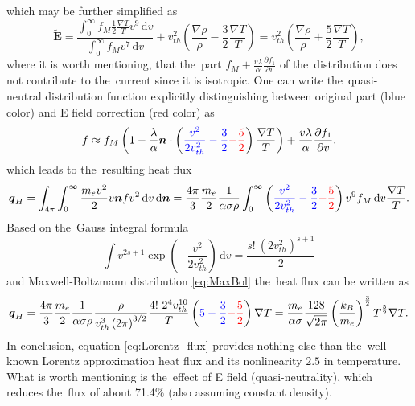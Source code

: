 \documentclass[review]{elsarticle}
\newcommand{\pdv}[2]{\frac{\partial{#1}}{\partial{#2}}}
\newcommand{\vect}[1]{\boldsymbol{#1}}
\newcommand{\dI}{\text{d}}
\newcommand{\mfp}{\lambda}
\newcommand{\vmag}{v}
\newcommand{\vth}{v_{th}}
\newcommand{\vn}{\vect{n}}
\newcommand{\tE}{\vect{\tilde{E}}}
\newcommand{\me}{m_e}
\newcommand{\kB}{k_B}
\newcommand{\crs}{\sigma}
\newcommand{\fM}{f_M}
\begin{document}
which may be further simplified as
\begin{equation}
  \tE = \frac{\int_0^{\infty} \fM
  \frac{1}{2}\frac{\nabla T}{T}\vmag^9\, \dI\vmag}
  {\int_0^{\infty} \fM \vmag^7\, \dI\vmag} + 
  \vth^2\left(\frac{\nabla\rho}{\rho} - \frac{3}{2}\frac{\nabla T}{T} \right)
  = \vth^2\left(\frac{\nabla\rho}{\rho} + \frac{5}{2}\frac{\nabla T}{T} 
  \right) ,
\end{equation}
where it is worth mentioning, that the~part 
$\fM + \frac{\vmag\mfp}{\alpha} \pdv{f_1}{\vmag}$ of the~distribution
does not contribute to the~current since it is isotropic.
One can write the~quasi-neutral distribution function explicitly 
distinguishing between original part (blue color) and E field correction
(red color) as
\begin{equation}
  f \approx \fM \left(1 - \frac{\mfp}{\alpha}\vn\cdot\left( 
  \textcolor{blue}{
  \frac{\vmag^2}{2 \vth^2} - \frac{3}{2}
  }
  \textcolor{red}{
  - \frac{5}{2}
  }
  \right) \frac{\nabla T}{T} \right) 
  + \frac{\vmag\mfp}{\alpha} \pdv{f_1}{\vmag} .
  \label{eq:f_localized_quasineutral}
\end{equation}
which leads to the~resulting heat flux
\begin{equation}
  \vect{q}_H = \int_{4\pi}\int_0^{\infty} \frac{\me \vmag^2}{2} \vmag \vn f 
  \vmag^2\, \dI\vmag\, \dI\vn = \frac{4\pi}{3}\frac{\me}{2}
  \frac{1}{\alpha \crs\rho}
  \int_0^{\infty} \left( 
  \textcolor{blue}{
  \frac{\vmag^2}{2 \vth^2} - \frac{3}{2}
  }
  \textcolor{red}{
  - \frac{5}{2}
  }
  \right) \vmag^9 \fM\, \dI\vmag \frac{\nabla T}{T} .
  \nonumber
\end{equation} 
Based on the~Gauss integral formula
\begin{equation}
  \int \vmag^{2s+1} \exp\left(-\frac{\vmag^2}{2\vth^2}\right)\, \dI\vmag = 
  \frac{s!~(2 \vth^2)^{s+1}}{2}
  \nonumber 
\end{equation}
and Maxwell-Boltzmann distribution \eqref{eq:MaxBol} the~heat flux can be 
written as
\begin{equation}
  \vect{q}_H = \frac{4\pi}{3}\frac{\me}{2}\frac{1}{\alpha \crs\rho}
  \frac{\rho}{\vth^3 \left( 2 \pi \right)^{3/2}}
  \frac{4!~2^4 \vth^{10}}{T} \left( 
  \textcolor{blue}{
  5 - \frac{3}{2}
  }
  \textcolor{red}{
  - \frac{5}{2}
  }
  \right) \nabla T 
  = \frac{\me}{\alpha \crs}\frac{128}{\sqrt{2 \pi}}
  \left(\frac{\kB}{\me}\right)^{\frac{3}{2}}T^{\frac{5}{2}} \nabla T .
  \label{eq:Lorentz_flux}
\end{equation} 
In conclusion, equation \eqref{eq:Lorentz_flux} provides nothing else than
the~well known Lorentz approximation heat flux and its nonlinearity $2.5$
in temperature. What is worth mentioning is the~effect of E field 
(quasi-neutrality), which reduces the~flux of about	71.4$\%$ 
(also assuming constant density).
\end{document}
